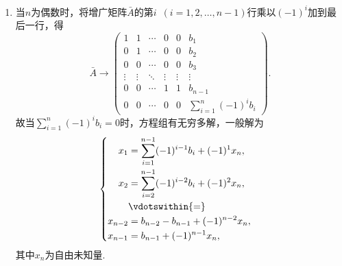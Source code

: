 \documentclass[12pt,fontset=fandol]{ctexart}
\begin{document}
\begin{solve}
\begin{enumerate}
                \item 当$n$为偶数时，将增广矩阵$\bar{A}$的第$i\enspace(i=1,2,\ldots,n-1)$行乘以$(-1)^i$加到最后一行，得
                      \[ \bar{A}\rightarrow\begin{pmatrix}
                              1      & 1      & \cdots & 0      & 0      & b_1                                  \\
                              0      & 1      & \cdots & 0      & 0      & b_2                                  \\
                              0      & 0      & \cdots & 0      & 0      & b_3                                  \\
                              \vdots & \vdots & \ddots & \vdots & \vdots & \vdots                               \\
                              0      & 0      & \cdots & 1      & 1      & b_{n-1}                              \\
                              0      & 0      & \cdots & 0      & 0      & \displaystyle\sum_{i=1}^{n}(-1)^ib_i
                          \end{pmatrix}. \]
                      故当$\displaystyle\sum_{i=1}^{n}(-1)^ib_i=0$时，方程组有无穷多解，一般解为
                      \[\begin{cases} \begin{aligned}
                                  x_1     & =\displaystyle\sum_{i=1}^{n-1}(-1)^{i-1}b_i+(-1)^1x_n, \\
                                  x_2     & =\displaystyle\sum_{i=2}^{n-1}(-1)^{i-2}b_i+(-1)^2x_n, \\
                                          & \vdotswithin{ = }                                      \\
                                  x_{n-2} & =b_{n-2}-b_{n-1}+(-1)^{n-2}x_n,                        \\
                                  x_{n-1} & =b_{n-1}+(-1)^{n-1}x_n,                                \\
                              \end{aligned} \end{cases}\]
                      其中$x_n$为自由未知量.


\end{enumerate}
\end{solve}
\end{document}
